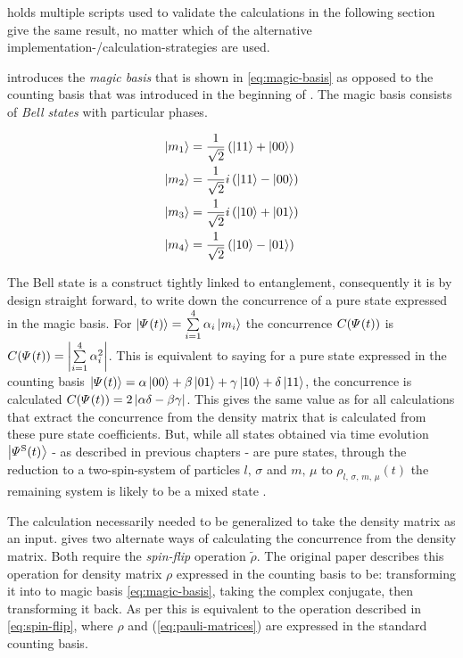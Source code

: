  holds multiple scripts used to validate the calculations in the following section give the same result, no matter which of the alternative implementation-/calculation-strategies are used.

\cite{concurrenceMainPaper} introduces the \emph{magic basis} that is shown in \autoref{eq:magic-basis} as opposed to the counting basis that was introduced in the beginning of . The magic basis consists of \emph{Bell states} with particular phases.

\begin{equation}
    \label{eq:magic-basis}
    \begin{split}
        \ketN[m_1] &= \frac{1}{\sqrt{2}} \left(\ketN[11] + \ketN[00]\right) \\
        \ketN[m_2] &= \frac{1}{\sqrt{2}} i \left(\ketN[11] - \ketN[00]\right) \\
        \ketN[m_3] &= \frac{1}{\sqrt{2}} i \left(\ketN[10] + \ketN[01]\right) \\
        \ketN[m_4] &= \frac{1}{\sqrt{2}} \left(\ketN[10] - \ketN[01]\right) \\
    \end{split}
\end{equation}

The Bell state is a construct tightly linked to entanglement, consequently it is by design straight forward, to write down the concurrence of a pure state expressed in the magic basis.
For $\ketN[\psiOfT] = \sum\limits_{i=1}^4 \alpha_i \ketN[m_i]$ the concurrence $C(\psiOfT)$ is $C(\psiOfT) = \left|\sum\limits_{i=1}^4 \alpha_i^2 \right|$.
This is equivalent to saying for a pure state expressed in the counting basis $\ketN[\psiOfT] = \alpha \ketN[00] +  \beta \ketN[01] +  \gamma \ketN[10] +  \delta\ketN[11]$, the concurrence is calculated $C(\psiOfT) = 2 \left|\alpha \delta - \beta \gamma\right|$.
This gives the same value as for all calculations that extract the concurrence from the density matrix that is calculated from these pure state coefficients.
But, while all states obtained via time evolution $\ketN[{\psiOfT[\schroedingerPicture]}]$ - as described in previous chapters - are pure states, through the reduction to a \glqq two-spin-system\grqq{} of particles $l,\,\sigma$ and $m,\,\mu$ to $\rho_{l,\,\sigma,\,m,\,\mu} (t)$ the remaining system is likely to be a mixed state \cite{mixedStateFromPureState}.

The calculation necessarily needed to be generalized to take the density matrix as an input.
\cite{concurrenceRewording} gives two alternate ways of calculating the concurrence from the density matrix.
Both require the \emph{spin-flip} operation $\tilde{\rho}$.
The original paper \cite{concurrenceMainPaper} describes this operation for density matrix $\rho$ expressed in the counting basis to be: transforming it into to magic basis \autoref{eq:magic-basis}, taking the complex conjugate, then transforming it back.
As per \cite{concurrenceRewording} this is equivalent to the operation described in \autoref{eq:spin-flip}, where $\rho$ and  (\autoref{eq:pauli-matrices}) are expressed in the standard counting basis.

